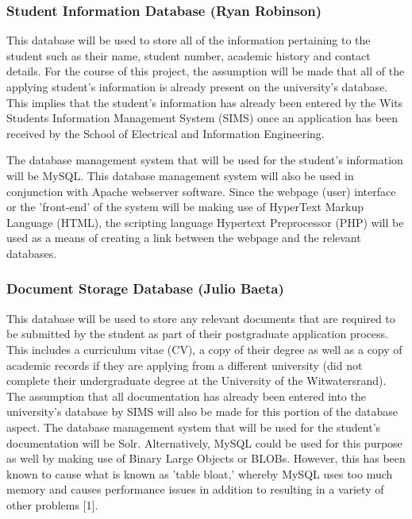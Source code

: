 \documentclass[journal,comsoc]{IEEEtran}
\begin{document}

\subsubsection{Student Information Database (Ryan Robinson)}

\hfill \break This database will be used to store all of the information pertaining to the student such as their name, student number, academic history and contact details. For the course of this project, the assumption will be made that all of the applying student's information is already present on the university's database. This implies that the student's information has already been entered by the Wits Students Information Management System (SIMS) once an application has been received by the School of Electrical and Information Engineering. \vspace{2mm}

The database management system that will be used for the student's information will be MySQL. This database management system will also be used in conjunction with Apache webserver software. Since the webpage (user) interface or the 'front-end' of the system will be making use of HyperText Markup Language (HTML), the scripting language Hypertext Preprocessor (PHP) will be used as a means of creating a link between the webpage and the relevant databases. \break


\subsubsection{Document Storage Database (Julio Baeta)}

\hfill \break This database will be used to store any relevant documents that are required to be submitted by the student as part of their postgraduate application process. This includes a curriculum vitae (CV), a copy of their degree as well as a copy of academic records if they are applying from a different university (did not complete their undergraduate degree at the University of the Witwatersrand). The assumption that all documentation has already been entered into the university's database by SIMS will also be made for this portion of the database aspect. The database management system that will be used for the student's documentation will be Solr. Alternatively, MySQL could be used for this purpose as well by making use of Binary Large Objects or BLOBs. However, this has been known to cause what is known as 'table bloat,' whereby MySQL uses too much memory and causes performance issues in addition to resulting in a variety of other problems [1]. \vspace{2mm}
\end{document}

